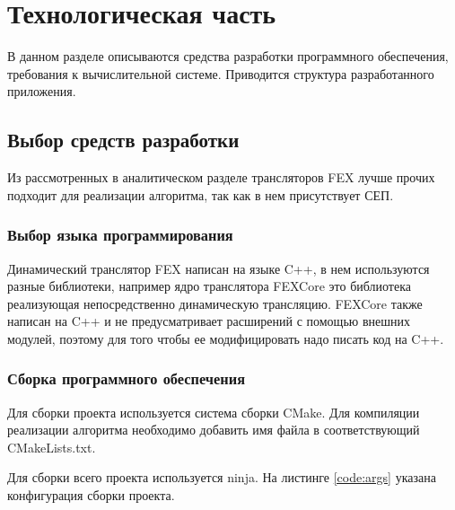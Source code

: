 \section{Технологическая часть}

В данном разделе описываются средства разработки программного обеспечения, требования к вычислительной системе. Приводится структура разработанного приложения.

\subsection{Выбор средств разработки}

Из рассмотренных в аналитическом разделе трансляторов FEX лучше прочих подходит для реализации алгоритма, так как в нем присутствует СЕП.

\subsubsection{Выбор языка программирования}

Динамический транслятор FEX написан на языке C++, в нем используются разные библиотеки, например ядро транслятора FEXCore это библиотека реализующая непосредственно динамическую трансляцию. FEXCore также написан на C++ и не предусматривает расширений с помощью внешних модулей, поэтому для того чтобы ее модифицировать надо писать код на C++.

\subsubsection{Сборка программного обеспечения}

Для сборки проекта используется система сборки
CMake. Для компиляции реализации алгоритма необходимо добавить имя файла в соответствующий CMakeLists.txt.

Для сборки всего проекта используется ninja. На листинге \ref{code:args} указана конфигурация сборки проекта.


